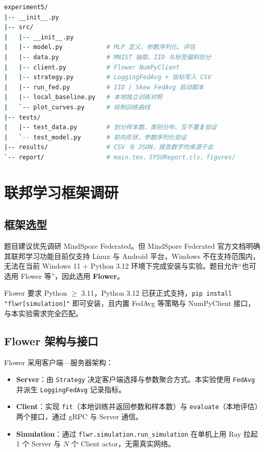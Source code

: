 \documentclass{SYSUReport}
\begin{document}
\begin{lstlisting}[language=bash, caption={实验五代码与数据目录}]
experiment5/
|-- __init__.py
|-- src/
|   |-- __init__.py
|   |-- model.py            # MLP 定义、参数序列化、评估
|   |-- data.py             # MNIST 抽取、IID 与标签偏斜划分
|   |-- client.py           # Flower NumPyClient
|   |-- strategy.py         # LoggingFedAvg + 指标写入 CSV
|   |-- run_fed.py          # IID / Skew FedAvg 启动脚本
|   |-- local_baseline.py   # 本地独立训练对照
|   `-- plot_curves.py      # 绘制训练曲线
|-- tests/
|   |-- test_data.py        # 划分样本数、类别分布、互不重复验证
|   `-- test_model.py       # 前向形状、参数序列化验证
|-- results/                # CSV 与 JSON，报告数字均来源于此
`-- report/                 # main.tex、SYSUReport.cls、figures/
\end{lstlisting}

\section{联邦学习框架调研}

\subsection{框架选型}

题目建议优先调研 MindSpore Federated。但 MindSpore Federated 官方文档明确其联邦学习功能目前仅支持 Linux 与 Android 平台，Windows 不在支持范围内，无法在当前 Windows 11 + Python 3.12 环境下完成安装与实验。题目允许“也可选用 Flower 等”，因此选用 \textbf{Flower}。

Flower 要求 Python $\geq$ 3.11，Python 3.12 已获正式支持，\texttt{pip install "flwr[simulation]"} 即可安装，且内置 FedAvg 等策略与 NumPyClient 接口，与本实验需求完全匹配。

\subsection{Flower 架构与接口}

Flower 采用客户端—服务器架构：

\begin{itemize}
  \item \textbf{Server}：由 \texttt{Strategy} 决定客户端选择与参数聚合方式。本实验使用 \texttt{FedAvg} 并派生 \texttt{LoggingFedAvg} 记录指标。
  \item \textbf{Client}：实现 \texttt{fit}（本地训练并返回参数和样本数）与 \texttt{evaluate}（本地评估）两个接口，通过 gRPC 与 Server 通信。
  \item \textbf{Simulation}：通过 \texttt{flwr.simulation.run\_simulation} 在单机上用 Ray 拉起 1 个 Server 与 $N$ 个 Client actor，无需真实网络。
\end{itemize}
\end{document}
